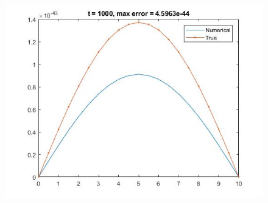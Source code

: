 \begin{figure}
\begin{minipage}{0.5\textwidth}
\includegraphics[width = \textwidth]{11.jpg}
\end{minipage}
\end{figure}

